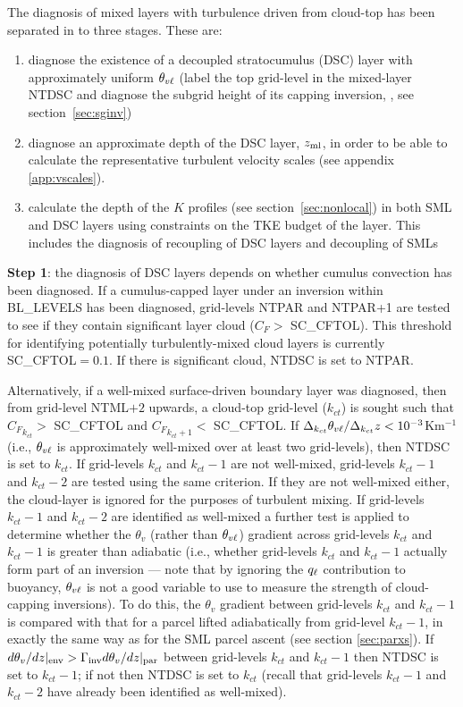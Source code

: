 \documentclass{UMDP_article}
\begin{document}
The diagnosis of mixed layers with turbulence driven from cloud-top
has been separated in to three stages.  These are:
\begin{enumerate}
\item diagnose the existence of a decoupled stratocumulus (DSC) layer
  with approximately uniform $\theta_{v\ell}$ (label the top grid-level in
  the mixed-layer NTDSC and diagnose the subgrid height of its capping
  inversion, \zhsc, see section~\ref{sec:sginv})
\item diagnose an approximate depth of the DSC layer, $z_{\rm ml}$, in order
  to be able to calculate the representative turbulent velocity scales
  (see appendix \ref{app:vscales}).
\item calculate the depth of the $K$ profiles (see
  section~\ref{sec:nonlocal}) in both SML and DSC layers using
  constraints on the TKE budget of the layer.  This includes the
  diagnosis of recoupling of DSC layers and decoupling of SMLs
\end{enumerate}

{\bf Step 1}: the diagnosis of DSC layers depends on whether cumulus
convection has been diagnosed.  If a cumulus-capped layer under an
inversion within BL\_LEVELS has been diagnosed, grid-levels NTPAR and
NTPAR+1 are tested to see if they contain significant layer cloud
($C_F>$ SC\_CFTOL).  This threshold for identifying potentially
turbulently-mixed cloud layers is currently SC\_CFTOL$=0.1$.  If there
is significant cloud, NTDSC is set to NTPAR.

Alternatively, if a well-mixed surface-driven boundary layer was
diagnosed, then from grid-level NTML$+2$ upwards, a cloud-top
grid-level ($k_{ct}$) is sought such that ${C_F}_{k_{ct}}>$ SC\_CFTOL
and ${C_F}_{k_{ct}+1}<$ SC\_CFTOL.  If $\Delta_{k_{ct}} \theta_{v\ell} /
\Delta_{k_{ct}} z < 10^{-3}$Km$^{-1}$ (\mbox{i.e.}, $\theta_{v\ell}$ is
approximately well-mixed over at least two grid-levels), then NTDSC is
set to $k_{ct}$.  If grid-levels $k_{ct}$ and $k_{ct}-1$ are not
well-mixed, grid-levels $k_{ct}-1$ and $k_{ct}-2$ are tested using the
same criterion.  If they are not well-mixed either, the cloud-layer is
ignored for the purposes of turbulent mixing.  If grid-levels
$k_{ct}-1$ and $k_{ct}-2$ are identified as well-mixed a further test
is applied to determine whether the $\theta_v$ (rather than
$\theta_{v\ell}$) gradient across grid-levels $k_{ct}$ and $k_{ct}-1$ is
greater than adiabatic (\mbox{i.e.}, whether grid-levels $k_{ct}$ and
$k_{ct}-1$ actually form part of an inversion --- note that by
ignoring the $q_{\ell}$ contribution to buoyancy, $\theta_{v\ell}$ is not a good
variable to use to measure the strength of cloud-capping inversions).
To do this, the $\theta_v$ gradient between grid-levels $k_{ct}$ and
$k_{ct}-1$ is compared with that for a parcel lifted adiabatically
from grid-level $k_{ct}-1$, in exactly the same way as for the SML
parcel ascent (see section \ref{sec:parxs}).  If $d\theta_v/dz|_{\rm
  env} > \Gamma_{\rm inv} d\theta_v/dz|_{\rm par} $ between
grid-levels $k_{ct}$ and $k_{ct}-1$ then NTDSC is set to $k_{ct}-1$;
if not then NTDSC is set to $k_{ct}$ (recall that grid-levels
$k_{ct}-1$ and $k_{ct}-2$ have already been identified as well-mixed).
\end{document}
